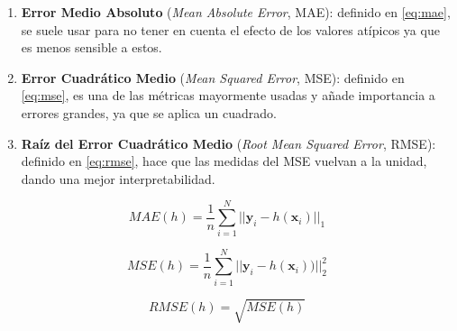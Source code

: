 \begin{enumerate}
  \item \textbf{Error Medio Absoluto} (\emph{Mean Absolute Error}, MAE): definido en \eqref{eq:mae}, se suele usar para no tener en cuenta el efecto de los valores atípicos ya que es menos sensible a estos.
  \item \textbf{Error Cuadrático Medio} (\emph{Mean Squared Error}, MSE): definido en \eqref{eq:mse}, es una de las métricas mayormente usadas y añade importancia a errores grandes, ya que se aplica un cuadrado.
  \item \textbf{Raíz del Error Cuadrático Medio} (\emph{Root Mean Squared Error}, RMSE): definido en \eqref{eq:rmse}, hace que las medidas del MSE vuelvan a la unidad, dando una mejor interpretabilidad.
\end{enumerate}

\begin{equation}
  MAE(h) = \dfrac{1}{n} \sum \limits^N_{i = 1} || \textbf{y}_i - h(\textbf{x}_i) ||_1
  \label{eq:mae}
\end{equation}

\begin{equation}
  MSE(h) = \dfrac{1}{n} \sum \limits^N_{i = 1} || \textbf{y}_i - h(\textbf{x}_i)) ||^2_2
  \label{eq:mse}
\end{equation}

\begin{equation}
  RMSE(h) = \sqrt{MSE(h)}
  \label{eq:rmse}
\end{equation}

\endinput
